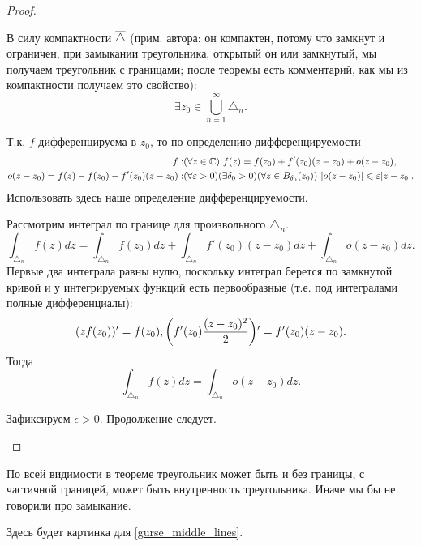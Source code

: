 \begin{proof}
\begin{enumerate}
		В силу компактности $\overline \triangle$ (прим. автора: он компактен, потому что замкнут и ограничен, при замыкании треугольника, открытый он или замкнутый, мы получаем треугольник с границами; после теоремы есть комментарий, как мы из компактности получаем это свойство):
		\[
			\exists z_0 \in \bigcup_{n = 1}^\infty \triangle_n.
		\]
		
		Т.к. $f$ дифференцируема в $z_0$, то по определению дифференцируемости
		\[
			\begin{aligned}
				f: & (\forall z \in \mathbb{C}) \,\, f(z) = f(z_0) + f'(z_0) (z - z_0) + o(z - z_0), \\
				o(z - z_0) = f(z) - f(z_0) - f'(z_0) (z - z_0) : & (\forall \varepsilon > 0) (\exists \delta_0 > 0) \mathopen{}\left( \forall z \in B_{\delta_0}(z_0) \right)\mathclose{} \,\, \mathopen{}\left\lvert o(z - z_0)\right\rvert\mathclose{} \leqslant \varepsilon \mathopen{}\left\lvert z - z_0\right\rvert\mathclose{}.
			\end{aligned}
		\]
		{\color{red} Использовать здесь наше определение дифференцируемости.}
		
		Рассмотрим интеграл по границе для произвольного $\triangle_n$.
		\[
			\int_{\triangle_n} f(z) dz = \int_{\triangle_n} f(z_0) dz + \int_{\triangle_n} f'(z_0) (z - z_0) dz + \int_{\triangle_n} o(z - z_0) dz.
		\]
		Первые два интеграла равны нулю, поскольку интеграл берется по замкнутой кривой и у интегрируемых функций есть первообразные (т.е. под интегралами полные дифференциалы):
		\[
			(z f(z_0))' = f(z_0), \mathopen{}\left( f'(z_0) \frac{(z - z_0)^2}{2} \right)\mathclose{}' = f'(z_0) (z - z_0).
		\]
		Тогда
		\[
			\int_{\triangle_n} f(z) dz = \int_{\triangle_n} o(z - z_0) dz.
		\]
		
		Зафиксируем $\epsilon > 0$. {\color{red} Продолжение следует.}
		
		
	\end{enumerate}
\end{proof}
\begin{anote}
	По всей видимости в теореме треугольник может быть и без границы, с частичной границей, может быть внутренность треугольника. Иначе мы бы не говорили про замыкание.
\end{anote}
\begin{anote}
	{\color{red} Здесь будет картинка для \ref{gurse_middle_lines}.}
\end{anote}

